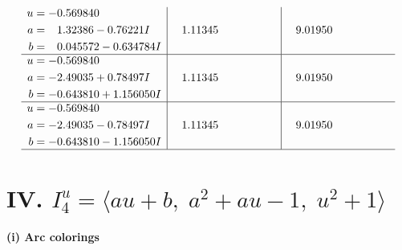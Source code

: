\documentclass[1p]{elsarticle_modified}
\theoremstyle{definition}
\begin{document}
$$\begin{array}{c|c|c}
\begin{aligned}
u &= -0.569840\phantom{ +0.000000I} \\
a &= \phantom{-}1.32386 - 0.76221 I \\
b &= \phantom{-}0.045572 - 0.634784 I\end{aligned}
 & \phantom{-}1.11345\phantom{ +0.000000I} & \phantom{-}9.01950\phantom{ +0.000000I} \\ \hline\begin{aligned}
u &= -0.569840\phantom{ +0.000000I} \\
a &= -2.49035 + 0.78497 I \\
b &= -0.643810 + 1.156050 I\end{aligned}
 & \phantom{-}1.11345\phantom{ +0.000000I} & \phantom{-}9.01950\phantom{ +0.000000I} \\ \hline\begin{aligned}
u &= -0.569840\phantom{ +0.000000I} \\
a &= -2.49035 - 0.78497 I \\
b &= -0.643810 - 1.156050 I\end{aligned}
 & \phantom{-}1.11345\phantom{ +0.000000I} & \phantom{-}9.01950\phantom{ +0.000000I}\\
 \hline 
 \end{array}$$\newpage\newpage\renewcommand{\arraystretch}{1}
\centering \section*{IV. $I^u_{4}= \langle a u+b,\;a^2+a u-1,\;u^2+1 \rangle$}
\flushleft \textbf{(i) Arc colorings}\\
\end{document}
